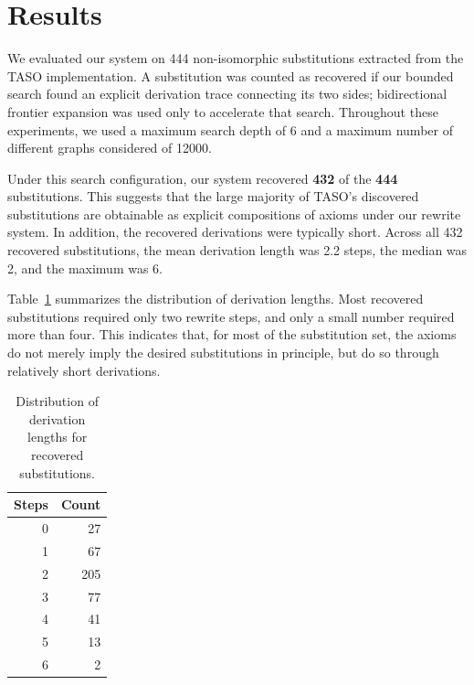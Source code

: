 \documentclass[sigplan,10pt,nonacm]{acmart}
\begin{document}


\section{Results}
\label{sec:results}

We evaluated our system on 444 non-isomorphic substitutions extracted from the TASO implementation. A substitution was counted as recovered if our bounded search found an explicit derivation trace connecting its two sides; bidirectional frontier expansion was used only to accelerate that search. Throughout these experiments, we used a maximum search depth of 6 and a maximum number of different graphs considered of 12000.

Under this search configuration, our system recovered \textbf{432} of the \textbf{444} substitutions. This suggests that the large majority of TASO's discovered substitutions are obtainable as explicit compositions of axioms under our rewrite system. In addition, the recovered derivations were typically short. Across all 432 recovered substitutions, the mean derivation length was 2.2 steps, the median was 2, and the maximum was 6.

Table~\ref{tab:deriv-stats} summarizes the distribution of derivation lengths. Most recovered substitutions required only two rewrite steps, and only a small number required more than four. This indicates that, for most of the substitution set, the axioms do not merely imply the desired substitutions in principle, but do so through relatively short derivations.

\begin{table}[t]
\centering
\caption{Distribution of derivation lengths for recovered substitutions.}
\label{tab:deriv-stats}
\begin{tabular}{r|r}
\textbf{Steps} & \textbf{Count} \\
\hline
0 & 27 \\
1 & 67 \\
2 & 205 \\
3 & 77 \\
4 & 41 \\
5 & 13 \\
6 & 2 \\
\end{tabular}
\end{table}
\end{document}

